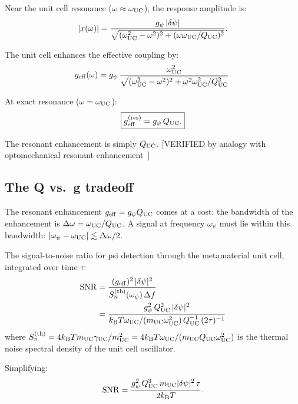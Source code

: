 \documentclass[11pt,twocolumn]{article}
\newcommand{\dpsi}{\delta\psi}
\newcommand{\kB}{k_{\mathrm{B}}}
\newcommand{\SNR}{\mathrm{SNR}}
\theoremstyle{definition}
\theoremstyle{remark}
\begin{document}
Near the unit cell resonance ($\omega \approx \omega_{\rm UC}$), the
response amplitude is:
\begin{equation}
|x(\omega)| = \frac{g_\psi\,|\dpsi|}
{\sqrt{(\omega_{\rm UC}^2 - \omega^2)^2 + (\omega\omega_{\rm UC}/Q_{\rm UC})^2}}.
\label{eq:UC_response}
\end{equation}

The unit cell enhances the effective coupling by:
\begin{equation}
g_{\rm eff}(\omega) = g_\psi\,\frac{\omega_{\rm UC}^2}
{\sqrt{(\omega_{\rm UC}^2-\omega^2)^2 + \omega^2\omega_{\rm UC}^2/Q_{\rm UC}^2}}.
\label{eq:g_eff}
\end{equation}

At exact resonance ($\omega = \omega_{\rm UC}$):
\begin{equation}
\boxed{
g_{\rm eff}^{(\rm res)} = g_\psi\,Q_{\rm UC}.
}
\label{eq:g_eff_res}
\end{equation}

The resonant enhancement is simply $Q_{\rm UC}$. [VERIFIED by analogy
with optomechanical resonant enhancement~\cite{Aspelmeyer2014}]

\subsection{The Q vs.\ g tradeoff}
\label{sec:Q_g_tradeoff}

The resonant enhancement $g_{\rm eff} = g_\psi Q_{\rm UC}$ comes at
a cost: the bandwidth of the enhancement is $\Delta\omega = \omega_{\rm UC}/Q_{\rm UC}$.
A signal at frequency $\omega_\psi$ must lie within this bandwidth:
$|\omega_\psi - \omega_{\rm UC}| \lesssim \Delta\omega/2$.

The signal-to-noise ratio for psi detection through the metamaterial unit cell,
integrated over time $\tau$:
\begin{align}
\SNR &= \frac{(g_{\rm eff})^2\,|\dpsi|^2}
{S_n^{\rm (th)}(\omega_\psi)\,\Delta f}
\nonumber\\
&= \frac{g_\psi^2\,Q_{\rm UC}^2\,|\dpsi|^2}
{\kB T\omega_{\rm UC}/(m_{\rm UC}\omega_{\rm UC}^2)\,Q_{\rm UC}^{-1}\,(2\tau)^{-1}}
\label{eq:SNR_UC}
\end{align}
where $S_n^{\rm (th)} = 4\kB T m_{\rm UC}\gamma_{\rm UC}/m_{\rm UC}^2
= 4\kB T\omega_{\rm UC}/(m_{\rm UC}Q_{\rm UC}\omega_{\rm UC}^2)$
is the thermal noise spectral density of the unit cell oscillator.

Simplifying:
\begin{equation}
\SNR = \frac{g_\psi^2\,Q_{\rm UC}^3\,m_{\rm UC}|\dpsi|^2\,\tau}
{2\kB T}.
\label{eq:SNR_UC_simplified}
\end{equation}
\end{document}
